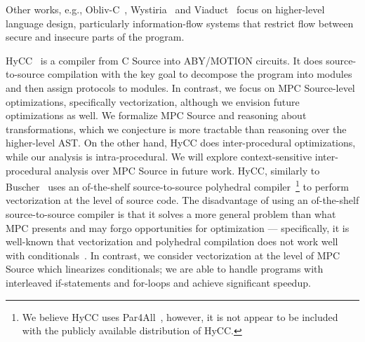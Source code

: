 Other works, e.g., Obliv-C~\cite{Zahur:2015}, Wystiria~\cite{SP:RasHamHic14} and Viaduct~\cite{Acay:2021} focus on higher-level language design, particularly information-flow systems that
restrict flow between secure and insecure parts of the program.


HyCC~\cite{CCS:BDKKS18} is a compiler from C Source into ABY/MOTION circuits. It does source-to-source compilation with the key goal to decompose the 
program into modules and then assign protocols to modules. In contrast, we focus on MPC Source-level optimizations, specifically vectorization, although we envision 
future optimizations as well. We formalize MPC Source and reasoning about transformations, which we conjecture is more tractable than reasoning over
the higher-level AST. On the other hand, HyCC does inter-procedural optimizations, while our analysis is intra-procedural. We will explore context-sensitive inter-procedural 
analysis over MPC Source in future work. HyCC, similarly to Buscher~\cite{Buscher:2018} uses an of-the-shelf source-to-source polyhedral compiler~\footnote{We believe HyCC uses 
Par4All~, however, it is not appear to be included with the publicly available distribution of HyCC.}
to perform vectorization at the level of source code. The disadvantage of using an of-the-shelf source-to-source compiler is that it solves a more general 
problem than what MPC presents and may forgo opportunities for optimization --- specifically, it is well-known that vectorization and polyhedral compilation 
does not work well with conditionals~\cite{Benabderrahmane:2010,Karrenberg:2015}. In contrast, we consider vectorization at the level of MPC Source which 
linearizes conditionals; we are able to handle programs with interleaved if-statements and for-loops and achieve significant speedup. 
 



